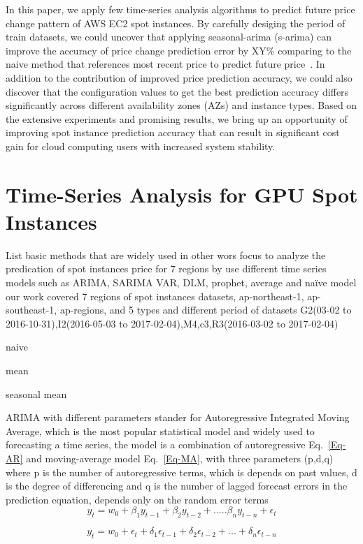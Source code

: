\documentclass[graybox]{svmult}
\begin{document}
In this paper, we apply few time-series analysis algorithms to predict future price change pattern of AWS EC2 spot instances. By carefully desiging the period of train datasets, we could uncover that applying seasonal-arima (s-arima) can improve the accuracy of price change prediction error by XY\% comparing to the naive method that references most recent price to predict future price~\cite{deep-spot-cloud}. In addition to the contribution of improved price prediction accuracy, we could also discover that the configuration values to get the best prediction accuracy differs significantly across different availability zones (AZs) and instance types. Based on the extensive experiments and promising results, we bring up an opportunity of improving spot instance prediction accuracy that can result in significant cost gain for cloud computing users with increased system stability.


\section{Time-Series Analysis for GPU Spot Instances}
List basic methods that are widely used in other wors
focus to analyze the predication of spot instances price for 7 regions by use different time series models such as ARIMA, SARIMA VAR, DLM, prophet, average and naïve model
our work covered  7 regions of spot instances datasets, ap-northeast-1, ap-southeast-1, ap-regions, and 5 types and different period of datasets G2(03-02 to 2016-10-31),I2(2016-05-03 to 2017-02-04),M4,c3,R3(2016-03-02 to 2017-02-04)


naive

mean

seasonal mean

ARIMA with different parameters 
stander for Autoregressive Integrated Moving Average, which is the most popular statistical model and widely used to forecasting a time series, the model is a combination of  autoregressive Eq.~\ref{Eq-AR} and moving-average model Eq.~\ref{Eq-MA}, with three parameters  (p,d,q) where p is the number of autoregressive terms, which is depends on past values, d is the degree of differencing and q is the number of lagged forecast errors in the prediction equation, depends only on the random error terms 
\begin{equation}
 y_t = w_0 +\beta_1 y_{t-1}+ \beta_2 y_{t-2}+.....\beta_n y_{t-n}+\epsilon_t
\label{Eq-AR}
\end{equation}


\begin{equation}
 y_t = w_0 +\epsilon_t + \delta_1 \epsilon_{t-1}+  \delta_2 \epsilon_{t-2}+...+ \delta_n \epsilon_{t-n}
\label{Eq-MA}
\end{equation}
\end{document}
